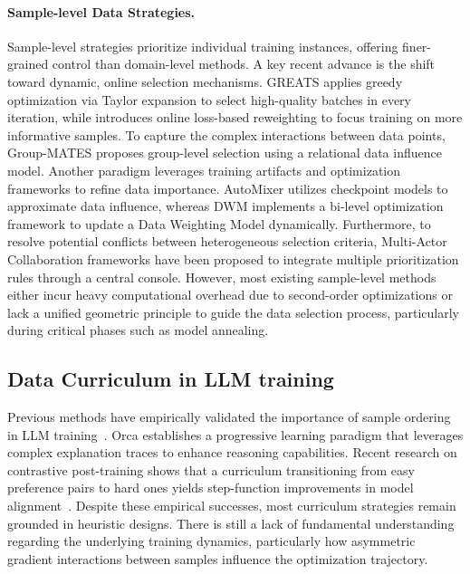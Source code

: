 \paragraph{Sample-level Data Strategies.}
Sample-level strategies prioritize individual training instances, offering finer-grained control than domain-level methods. 
A key recent advance is the shift toward dynamic, online selection mechanisms. 
GREATS \citep{DBLP:conf/nips/WangWSM024} applies greedy optimization via Taylor expansion to select high-quality batches in every iteration, while \citet{DBLP:conf/iclr/SowWB0JL25} introduces online loss-based reweighting to focus training on more informative samples. 
To capture the complex interactions between data points, Group-MATES \citep{yu2025grouplevel} proposes group-level selection using a relational data influence model. Another paradigm leverages training artifacts and optimization frameworks to refine data importance. 
AutoMixer \citep{DBLP:conf/acl/Chang0HVKSC25} utilizes checkpoint models to approximate data influence, whereas DWM \citep{DBLP:conf/icml/00560ZTH0T25} implements a bi-level optimization framework to update a Data Weighting Model dynamically. 
Furthermore, to resolve potential conflicts between heterogeneous selection criteria, Multi-Actor Collaboration frameworks \citep{DBLP:conf/acl/Bai0WSZPZWQZYH25} have been proposed to integrate multiple prioritization rules through a central console. 
However, most existing sample-level methods either incur heavy computational overhead due to second-order optimizations or lack a unified geometric principle to guide the data selection process, particularly during critical phases such as model annealing.

\subsection{Data Curriculum in LLM training}
Previous methods have empirically validated the importance of sample ordering in LLM training~\cite{Kim2024StrategicOrdering,Pouransari2024DatasetDecomposition,Jia2025CurriculumEffects}. Orca \cite{mukherjee2023orca} establishes a progressive learning paradigm that leverages complex explanation traces to enhance reasoning capabilities. 
Recent research on contrastive post-training shows that a curriculum transitioning from easy preference pairs to hard ones yields step-function improvements in model alignment~\cite{DBLP:conf/emnlp/ZhouAZIZSXZ24}. 
Despite these empirical successes, most curriculum strategies remain grounded in heuristic designs. There is still a lack of fundamental understanding regarding the underlying training dynamics, particularly how asymmetric gradient interactions between samples influence the optimization trajectory.
